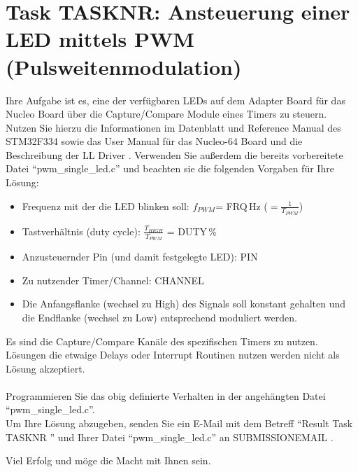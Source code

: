 \documentclass[a4paper,12pt]{article}
\begin{document}
\pagestyle{empty}
\setlength{\parindent}{0em}
\section*{Task {{TASKNR}}: Ansteuerung einer LED mittels PWM (Pulsweitenmodulation)}

Ihre Aufgabe ist es, eine der verfügbaren LEDs auf dem Adapter Board für das Nucleo Board über die Capture/Compare Module eines Timers zu steuern. Nutzen Sie hierzu die Informationen im Datenblatt \cite{data_sheet} und Reference Manual \cite{ref_manual} des STM32F334 sowie das User Manual für das Nucleo-64 Board \cite{nucleo_manual} und die Beschreibung der LL Driver \cite{driver_manual}. Verwenden Sie außerdem die bereits vorbereitete Datei \enquote{pwm\_single\_led.c} und beachten sie die folgenden Vorgaben für Ihre Lösung:

\begin{itemize}
\item Frequenz mit der die LED blinken soll: $f_{PWM}$= {{FRQ}}\,Hz ($=\frac{1}{T_{PWM}}$)
\item Tastverh\"altnis (duty cycle):  $\frac{T_{HIGH}}{T_{PWM}}$ = {{DUTY}}\,\%
\item Anzusteuernder Pin (und damit festgelegte LED): {{PIN}}
\item Zu nutzender Timer/Channel: {{CHANNEL}}
\item Die Anfangsflanke (wechsel zu High) des Signals soll konstant gehalten und die Endflanke (wechsel zu Low) entsprechend moduliert werden.
\end{itemize}
\vspace{0.3cm}

Es sind die Capture/Compare Kanäle des spezifischen Timers zu nutzen. Lösungen die etwaige Delays oder Interrupt Routinen nutzen werden nicht als Lösung akzeptiert.
\\

\\

Programmieren Sie das obig definierte Verhalten in der angeh\"angten Datei \enquote{pwm\_single\_led.c}.
\\

Um Ihre L\"osung abzugeben, senden Sie ein E-Mail mit dem Betreff \enquote{Result Task {{ TASKNR }}} und Ihrer Datei \enquote{pwm\_single\_led.c}  an {{ SUBMISSIONEMAIL }}.

\vspace{0.7cm}

Viel Erfolg und m\"oge die Macht mit Ihnen sein.

\newpage
\printbibliography[heading=bibintoc]
\end{document}

